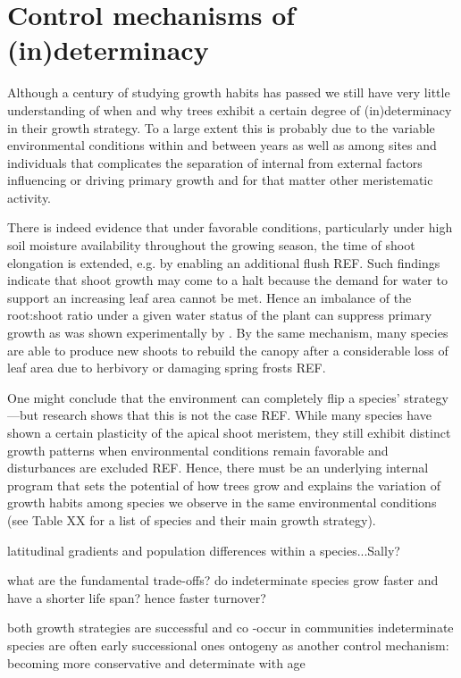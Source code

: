 \documentclass{article}
\begin{document}

	
\section*{Control mechanisms of (in)determinacy}
Although a century of studying growth habits has passed we still have very little understanding of when and why trees exhibit a certain degree of (in)determinacy in their growth strategy. To a large extent this is probably due to the variable environmental conditions within and between years as well as among sites and individuals that complicates the separation of internal from external factors influencing or driving primary growth and for that matter other meristematic activity.

There is indeed evidence that under favorable conditions, particularly under high soil moisture availability throughout the growing season, the time of shoot elongation is extended, e.g. by enabling an additional flush REF. Such findings indicate that shoot growth may come to a halt because the demand for water to support an increasing leaf area cannot be met. Hence an imbalance of the root:shoot ratio under a given water status of the plant can suppress primary growth as was shown experimentally by \citet{borchertSimulationRhythmicTree1973}. By the same mechanism, many species are able to produce new shoots to rebuild the canopy after a considerable loss of leaf area due to herbivory or damaging spring frosts REF. 

One might conclude that the environment can completely flip a species' strategy---but research shows that this is not the case REF.  While many species have shown a certain plasticity of the apical shoot meristem, they still exhibit distinct growth patterns when environmental conditions remain favorable and disturbances are excluded REF. Hence, there must be an underlying internal program that sets the potential of how trees grow and explains the variation of growth habits among species we observe in the same environmental conditions (see Table XX for a list of species and their main growth strategy). 

latitudinal gradients and population differences within a species...Sally?
	
what are the fundamental trade-offs? 
do indeterminate species grow faster and have a shorter life span? hence faster turnover?

both growth strategies are successful and co -occur in communities
indeterminate species are often early successional ones \citep{marksRelationExtensionGrowth1975, boojhGrowthStrategyTrees1982}
ontogeny as another control mechanism: becoming more conservative and determinate with age	
\end{document}
